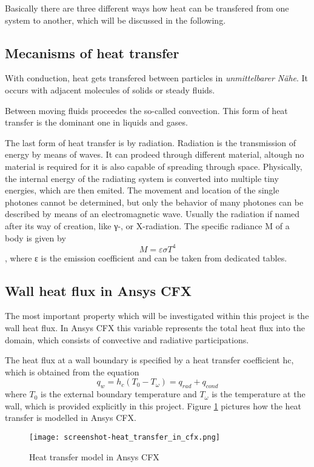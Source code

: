 Basically there are three different ways how heat can be transfered from one system to another, which will be discussed in the following.
\subsection{Mecanisms of heat transfer}
With conduction, heat gets transfered between particles in \emph{unmittelbarer Nähe}. It occurs with adjacent molecules of solids or steady fluids.

Between moving fluids proceedes the so-called convection. This form of heat transfer is the dominant one in liquids and gases.

The last form of heat transfer is by radiation. Radiation is the transmission of energy by means of waves. It can prodeed through different material, altough no material is required for it is also capable of spreading through space. Physically, the internal energy of the radiating system is converted into multiple tiny energies, which are then emited. The movement and location of the single photones cannot be determined, but only the behavior of many photones can be described by means of an electromagnetic wave. Usually the radiation if named after its way of creation, like γ-, or X-radiation. 
The specific radiance M of a body is given by
\begin{equation}
M = \varepsilon \sigma T^4
\end{equation},
where ε is the emission coefficient and can be taken from dedicated tables.
\subsection{Wall heat flux in Ansys CFX}
The most important property which will be investigated within this project is the wall heat flux. In Ansys CFX this variable represents the total heat flux into the domain, which consists of convective and radiative participations.

The heat flux at a wall boundary is specified by a heat transfer coefficient hc, which is obtained from the equation
\begin{equation}
q_w = h_c (T_0 - T_{\omega} ) = q_{rad} + q_{cond}
\end{equation}
where $T_0$ is the external boundary temperature and $T_{\omega}$ is the temperature at the wall, which is provided explicitly in this project. Figure \ref{fig:ht_in_cfx} pictures how the heat transfer is modelled in Ansys CFX.
\begin{figure}[h]
\centering
\texttt{[image: screenshot-heat\_transfer\_in\_cfx.png]}
\caption{Heat transfer model in Ansys CFX}
\label{fig:ht_in_cfx}
\end{figure}
